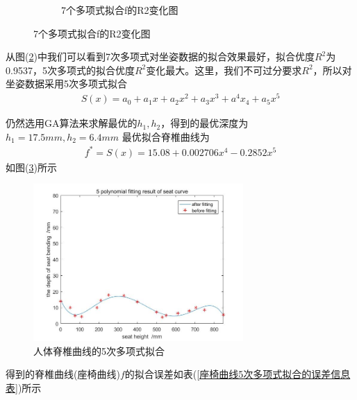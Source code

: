 \begin{figure}[H]
\begin{subfigure}[b]{0.4\textwidth}
                        \caption{7个多项式拟合f的R2变化图}
                        \label{7个多项式拟合f的R2变化图}
                    \end{subfigure}
                \end{figure}
            \par
            从图(\ref{7个多项式拟合f的R2变化图})中我们可以看到7次多项式对坐姿数据的拟合效果最好，拟合优度$R^2$为0.9537，5次多项式的拟合优度$R^2$变化最大。这里，我们不可过分要求$R^2$，所以对坐姿数据采用5次多项式拟合
            \begin{align*}
            S(x) = a_0+a_1x+a_2 x^2 + a_3 x^3+a^4x_4+a_5x^5
            \end{align*}
            \par
            仍然选用GA算法来求解最优的$h_1,h_2$，得到的最优深度为$h_1 =17.5mm,h_2=6.4mm$
            最优拟合脊椎曲线为
            \begin{align*}
            f^* = S(x) = 15.08 + 0.002706x^4 - 0.2852x^5
            \end{align*}
            如图(\ref{人体脊椎曲线的5次多项式拟合})所示
            \begin{figure}[H]
            \centering
            \includegraphics[width = 8cm]{images/jizuiquxian_5ciduoxiangshi.jpg}
            \caption{人体脊椎曲线的5次多项式拟合}
            \label{人体脊椎曲线的5次多项式拟合}
            \end{figure}
            得到的脊椎曲线(座椅曲线)$f$的拟合误差如表(\ref{座椅曲线5次多项式拟合的误差信息表})所示
